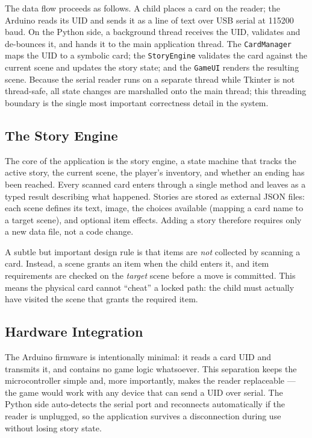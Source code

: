 The data flow proceeds as follows. A child places a card on the reader; the
Arduino reads its UID and sends it as a line of text over USB serial at
115200 baud. On the Python side, a background thread receives the UID,
validates and de-bounces it, and hands it to the main application thread. The
\texttt{CardManager} maps the UID to a symbolic card; the \texttt{StoryEngine}
validates the card against the current scene and updates the story state; and
the \texttt{GameUI} renders the resulting scene. Because the serial reader
runs on a separate thread while Tkinter is not thread-safe, all state changes
are marshalled onto the main thread; this threading boundary is the single
most important correctness detail in the system.

\subsection{The Story Engine}
The core of the application is the story engine, a state machine that tracks
the active story, the current scene, the player's inventory, and whether an
ending has been reached. Every scanned card enters through a single method
and leaves as a typed result describing what happened. Stories are stored as
external JSON files: each scene defines its text, image, the choices
available (mapping a card name to a target scene), and optional item effects.
Adding a story therefore requires only a new data file, not a code change.

A subtle but important design rule is that items are \emph{not} collected by
scanning a card. Instead, a scene grants an item when the child enters it,
and item requirements are checked on the \emph{target} scene before a move is
committed. This means the physical card cannot ``cheat'' a locked path: the
child must actually have visited the scene that grants the required item.

\subsection{Hardware Integration}
The Arduino firmware is intentionally minimal: it reads a card UID and
transmits it, and contains no game logic whatsoever. This separation keeps
the microcontroller simple and, more importantly, makes the reader
replaceable --- the game would work with any device that can send a UID over
serial. The Python side auto-detects the serial port and reconnects
automatically if the reader is unplugged, so the application survives a
disconnection during use without losing story state.


